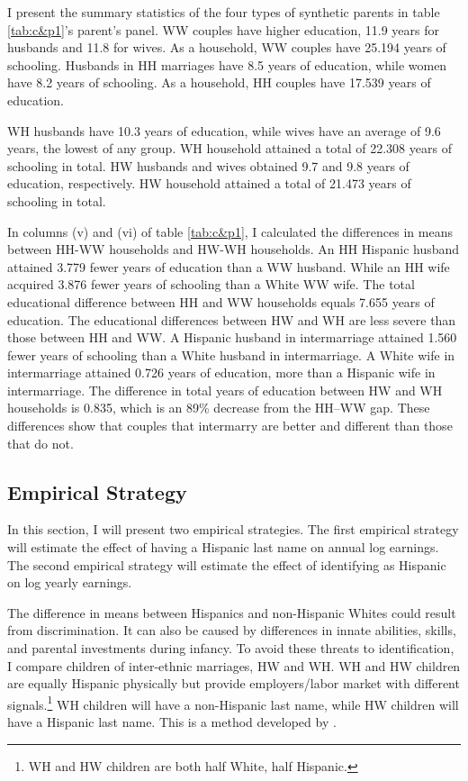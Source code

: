 \documentclass[12pt, fullpage]{article}
\begin{document}
I present the summary statistics of the four types of synthetic parents in table \ref{tab:c&p1}'s parent's panel. WW couples have higher education, 11.9 years for husbands and 11.8 for wives. As a household, WW couples have 25.194 years of schooling. Husbands in HH marriages have 8.5 years of education, while women have 8.2 years of schooling. As a household, HH couples have 17.539 years of education.

WH husbands have 10.3 years of education, while wives have an average of 9.6 years, the lowest of any group. WH household attained a total of 22.308 years of schooling in total. HW husbands and wives obtained 9.7 and 9.8 years of education, respectively. HW household attained a total of 21.473 years of schooling in total.

\newpage





\newpage

In columns (v) and (vi) of table \ref{tab:c&p1}, I calculated the differences in means between HH-WW households and HW-WH households. An HH Hispanic husband attained 3.779 fewer years of education than a WW husband. While an HH wife acquired 3.876 fewer years of schooling than a White WW wife. The total educational difference between HH and WW households equals 7.655 years of education. The educational differences between HW and WH are less severe than those between HH and WW. A Hispanic husband in intermarriage attained 1.560 fewer years of schooling than a White husband in intermarriage. A White wife in intermarriage attained 0.726 years of education, more than a Hispanic wife in intermarriage. The difference in total years of education between HW and WH households is 0.835, which is an 89\% decrease from the HH--WW gap. These differences show that couples that intermarry are better and different than those that do not.

\subsection{Empirical Strategy}\label{sec:emp_model}
In this section, I will present two empirical strategies. The first empirical strategy will estimate the effect of having a Hispanic last name on annual log earnings. The second empirical strategy will estimate the effect of identifying as Hispanic on log yearly earnings.

The difference in means between Hispanics and non-Hispanic Whites could result from discrimination. It can also be caused by differences in innate abilities, skills, and parental investments during infancy. To avoid these threats to identification, I compare children of inter-ethnic marriages, HW and WH. WH and HW children are equally Hispanic physically but provide employers/labor market with different signals.\footnote{WH and HW children are both half White, half Hispanic.} WH children will have a non-Hispanic last name, while HW children will have a Hispanic last name. This is a method developed by \citet{rubinstein2014pride}.
\end{document}
